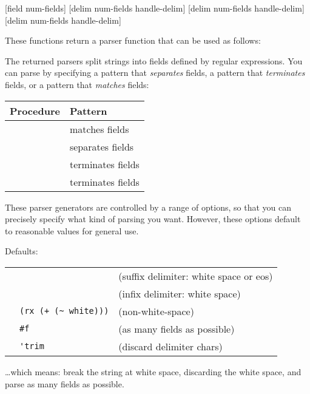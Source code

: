   {[field num-fields]}             \proc
{}  {[delim num-fields handle-delim]} \proc
{} {[delim num-fields handle-delim]} \proc
{} {[delim num-fields handle-delim]} \proc
\begin{desc}
These functions return a parser function that can be used as follows:

    The returned parsers split strings into fields defined
    by regular expressions.  You can parse by specifying a pattern that
    \emph{separates} fields, a pattern that \emph{terminates} fields, or
    a pattern that \emph{matches} fields:
        \begin{inset}
        \begin{tabular}{l@{\qquad}l}    
        Procedure &                     Pattern \\ \hline
        \ex{field-splitter} &           matches fields  \\
        \ex{infix-splitter} &           separates fields \\
        \ex{suffix-splitter}&           terminates fields \\
        \ex{sloppy-suffix-splitter} &   terminates fields
        \end{tabular}
        \end{inset}
    
    These parser generators are controlled by a range of options, so that you
    can precisely specify what kind of parsing you want. However, these
    options default to reasonable values for general use.

    Defaults:
\begin{tightinset}
\begin{tabular}{l@{\quad=\quad }ll}
 \var{delim} & \ex{(rx (| (+ white) eos))}    & (suffix delimiter: white space or eos) \\
 \multicolumn{1}{l}{}                & \ex{(rx (+ white))}   & (infix  delimiter: white space) \\

 \var{field}    & \verb|(rx (+ (~ white)))|   & (non-white-space) \\
    
 \var{num-fields} & \verb|#f| & (as many fields as possible) \\
    
 \var{handle-delim} & \verb|'trim| & (discard delimiter chars)
\end{tabular}
\end{tightinset}
    {\ldots}which means: break the string at white space, discarding the
     white space, and parse as many fields as possible.


\end{desc}
